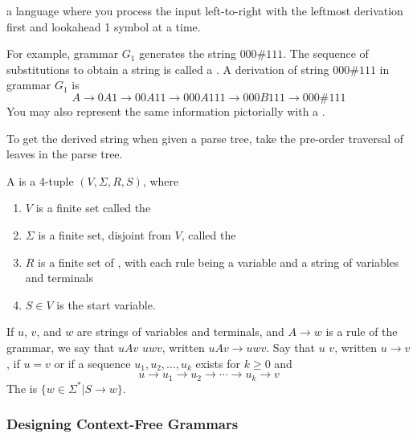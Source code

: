 \documentclass{article}
\begin{document}
\begin{definition}[LL(1) Grammar]
  a language where you process the input left-to-right with the leftmost derivation first and lookahead 1 symbol at a time.
\end{definition}

For example, grammar $G_1$ generates the string $000\#111$. The sequence of substitutions to obtain a string is called a . A derivation of string $000\#111$ in grammar $G_1$ is $$A \rightarrow 0A1 \rightarrow 00A11 \rightarrow 000A111 \rightarrow 000B111 \rightarrow 000\#111$$ You may also represent the same information pictorially with a .  

\begin{remark}
  To get the derived string when given a parse tree, take the pre-order traversal of leaves in the parse tree. 
\end{remark}

\begin{definition}
  A  is a 4-tuple $(V, \Sigma, R, S)$, where 
  \begin{enumerate}
    \item $V$ is a finite set called the 
    \item $\Sigma$ is a finite set, disjoint from $V$, called the 
    \item $R$ is a finite set of , with each rule being a variable and a string of variables and terminals 
    \item $S \in V$ is the start variable.
  \end{enumerate}
\end{definition}

If $u$, $v$, and $w$ are strings of variables and terminals, and $A \rightarrow w$ is a rule of the grammar, we say that $uAv$  $uwv$, written $uAv \rightarrow uwv$. Say that $u$  $v$, written $u \rightarrow v$, if $u = v$ or if a sequence $u_1 , u_2 , \dots , u_k$ exists for $k \geq 0$ and $$u \rightarrow u_1 \rightarrow u_2 \rightarrow \cdots \rightarrow u_k \rightarrow v$$ The  is $\{w \in \Sigma^{*} \vert S \rightarrow w \}$.

\subsubsection{Designing Context-Free Grammars}
\end{document}
